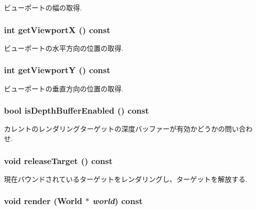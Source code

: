 ビューポートの幅の取得. \hypertarget{classm3g_1_1Graphics3D_af58b44cc6219f86c40dadb8a9377856}{
\subsubsection[{getViewportX}]{\setlength{\rightskip}{0pt plus 5cm}int getViewportX () const}}
\label{classm3g_1_1Graphics3D_af58b44cc6219f86c40dadb8a9377856}


ビューポートの水平方向の位置の取得. \hypertarget{classm3g_1_1Graphics3D_c21665afbf94a8f0153e099833c2b61a}{
\subsubsection[{getViewportY}]{\setlength{\rightskip}{0pt plus 5cm}int getViewportY () const}}
\label{classm3g_1_1Graphics3D_c21665afbf94a8f0153e099833c2b61a}


ビューポートの垂直方向の位置の取得. \hypertarget{classm3g_1_1Graphics3D_7f17c6781152840d42e756c27b0fb8c8}{
\subsubsection[{isDepthBufferEnabled}]{\setlength{\rightskip}{0pt plus 5cm}bool isDepthBufferEnabled () const}}
\label{classm3g_1_1Graphics3D_7f17c6781152840d42e756c27b0fb8c8}


カレントのレンダリングターゲットの深度バッファーが有効かどうかの問い合わせ. \hypertarget{classm3g_1_1Graphics3D_3ffaaf0d0f1e97a07c7f30c9b5a5dd32}{
\subsubsection[{releaseTarget}]{\setlength{\rightskip}{0pt plus 5cm}void releaseTarget () const}}
\label{classm3g_1_1Graphics3D_3ffaaf0d0f1e97a07c7f30c9b5a5dd32}


現在バウンドされているターゲットをレンダリングし、ターゲットを解放する. \hypertarget{classm3g_1_1Graphics3D_8ef004c92d601203b8c697d441e7713f}{
\subsubsection[{render}]{\setlength{\rightskip}{0pt plus 5cm}void render ({\bf World} $\ast$ {\em world}) const}}
\label{classm3g_1_1Graphics3D_8ef004c92d601203b8c697d441e7713f}


